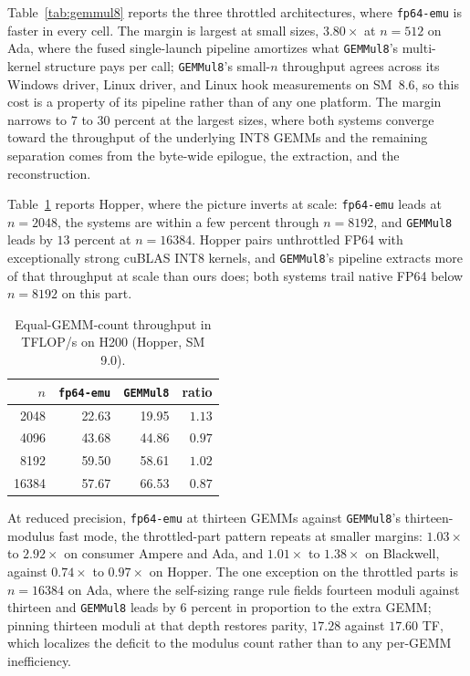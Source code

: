 \documentclass[11pt]{amsart}
\theoremstyle{plain}
\theoremstyle{definition}
\newcommand{\code}[1]{\texttt{#1}}
\newcommand{\fpemu}{\code{fp64-emu}}
\newcommand{\gemmul}{\code{GEMMul8}}
\begin{document}
Table~\ref{tab:gemmul8} reports the three throttled architectures, where
\fpemu{} is faster in every cell. The margin is largest at small sizes,
$3.80\times$ at $n = 512$ on Ada, where the fused single-launch pipeline
amortizes what \gemmul{}'s multi-kernel structure pays per call;
\gemmul{}'s small-$n$ throughput agrees across its Windows driver, Linux
driver, and Linux hook measurements on SM~8.6, so this cost is a property
of its pipeline rather than of any one platform. The margin narrows to
$7$ to $30$ percent at the largest sizes, where both systems converge
toward the throughput of the underlying INT8 GEMMs and the remaining
separation comes from the byte-wide epilogue, the extraction, and the
reconstruction.

Table~\ref{tab:hopper} reports Hopper, where the picture inverts at
scale: \fpemu{} leads at $n = 2048$, the systems are within a few percent
through $n = 8192$, and \gemmul{} leads by $13$ percent at $n = 16384$.
Hopper pairs unthrottled FP64 with exceptionally strong cuBLAS INT8
kernels, and \gemmul{}'s pipeline extracts more of that throughput at
scale than ours does; both systems trail native FP64 below $n = 8192$ on
this part.

\begin{table}[t]
\centering
\caption{Equal-GEMM-count throughput in TFLOP/s on H200 (Hopper, SM 9.0).}
\label{tab:hopper}
\begin{tabular}{rrrr}
\toprule
$n$ & \fpemu{} & \gemmul{} & ratio \\
\midrule
2048 & 22.63 & 19.95 & $1.13$ \\
4096 & 43.68 & 44.86 & $0.97$ \\
8192 & 59.50 & 58.61 & $1.02$ \\
16384 & 57.67 & 66.53 & $0.87$ \\
\bottomrule
\end{tabular}
\end{table}

At reduced precision, \fpemu{} at thirteen GEMMs against \gemmul{}'s
thirteen-modulus fast mode, the throttled-part pattern repeats at smaller
margins: $1.03\times$ to $2.92\times$ on consumer Ampere and Ada, and
$1.01\times$ to $1.38\times$ on Blackwell, against $0.74\times$ to
$0.97\times$ on Hopper. The one exception on the throttled parts is
$n = 16384$ on Ada, where the self-sizing range rule fields fourteen
moduli against thirteen and \gemmul{} leads by $6$ percent in proportion
to the extra GEMM; pinning thirteen moduli at that depth restores parity,
$17.28$ against $17.60$ TF, which localizes the deficit to the modulus
count rather than to any per-GEMM inefficiency.
\end{document}
